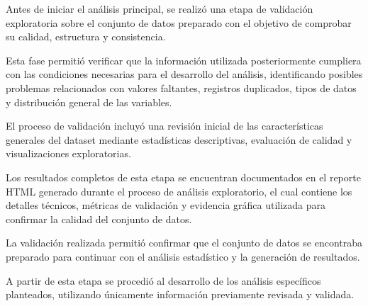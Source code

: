 
Antes de iniciar el análisis principal, se realizó una etapa de validación exploratoria sobre el conjunto de datos preparado con el objetivo de comprobar su calidad, estructura y consistencia.

Esta fase permitió verificar que la información utilizada posteriormente cumpliera con las condiciones necesarias para el desarrollo del análisis, identificando posibles problemas relacionados con valores faltantes, registros duplicados, tipos de datos y distribución general de las variables.





El proceso de validación incluyó una revisión inicial de las características generales del dataset mediante estadísticas descriptivas, evaluación de calidad y visualizaciones exploratorias.

Los resultados completos de esta etapa se encuentran documentados en el reporte HTML generado durante el proceso de análisis exploratorio, el cual contiene los detalles técnicos, métricas de validación y evidencia gráfica utilizada para confirmar la calidad del conjunto de datos.





La validación realizada permitió confirmar que el conjunto de datos se encontraba preparado para continuar con el análisis estadístico y la generación de resultados.

A partir de esta etapa se procedió al desarrollo de los análisis específicos planteados, utilizando únicamente información previamente revisada y validada.